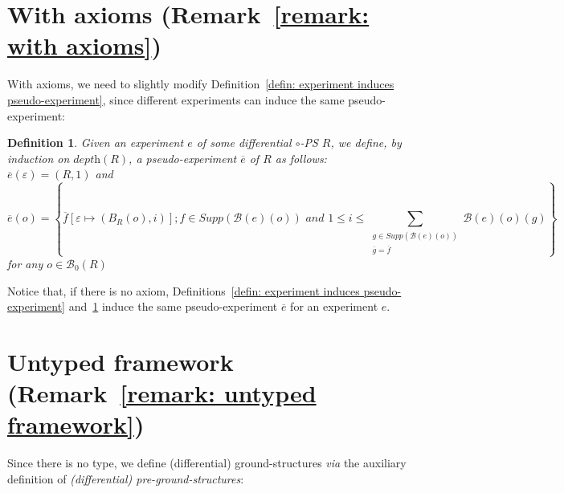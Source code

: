 \documentclass{article}
\theoremstyle{plain}
\newtheorem{definition}{Definition}
\newcommand{\emptysequence}{\varepsilon}
\newcommand{\boxes}[1]{\mathcal{B}(#1)}
\newcommand{\boxesatzero}[1]{\mathcal{B}_{0}(#1)}
\begin{document}
\section{With axioms (Remark~\ref{remark: with axioms})}

With axioms, we need to slightly modify Definition~\ref{defin: experiment induces pseudo-experiment}, since different experiments can induce the same pseudo-experiment:

\begin{definition}\label{defin: experiment induces pseudo-experiment - with axioms}
Given an experiment $e$ of some differential $\circ$-PS $R$, we define, by induction on $\textit{depth}(R)$, a pseudo-experiment $\overline{e}$ of $R$ as follows: $\overline{e}(\emptysequence) = (R, 1)$ and 
$$\overline{e}(o) = \left\lbrace \overline{f}[\emptysequence \mapsto (B_R(o), i)] ; f \in \textit{Supp}(\boxes{e}(o)) \textit{ and } 1 \leq i \leq \sum_{\begin{array}{c} g \in \textit{Supp}(\boxes{e}(o))\\ \overline{g} = \overline{f} \end{array}} \mathcal{B}(e)(o)(g) \right\rbrace$$ for any $o \in \boxesatzero{R}$
\end{definition}

Notice that, if there is no axiom, Definitions~\ref{defin: experiment induces pseudo-experiment} and~\ref{defin: experiment induces pseudo-experiment - with axioms} induce the same pseudo-experiment $\overline{e}$ for an experiment $e$.

\section{Untyped framework (Remark~\ref{remark: untyped framework})}

Since there is no type, we define (differential) ground-structures \emph{via} the auxiliary definition of \emph{(differential) pre-ground-structures}:
\end{document}
